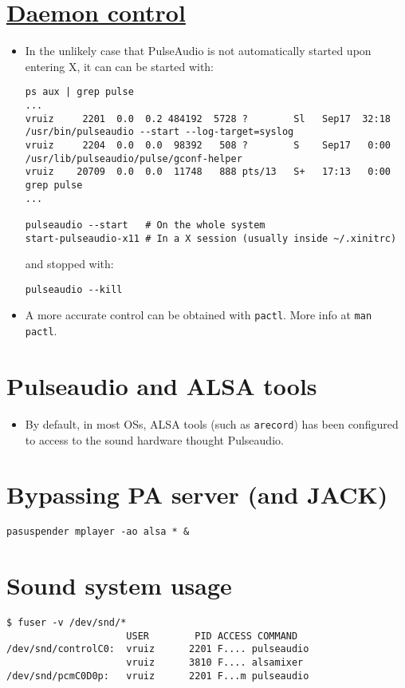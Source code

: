 \section{\href{https://wiki.archlinux.org/index.php/PulseAudio}{Daemon control}}
\begin{itemize}

\item In the unlikely case that PulseAudio is not automatically
  started upon entering X, it can can be started with:
\begin{verbatim}
ps aux | grep pulse
...
vruiz     2201  0.0  0.2 484192  5728 ?        Sl   Sep17  32:18 /usr/bin/pulseaudio --start --log-target=syslog
vruiz     2204  0.0  0.0  98392   508 ?        S    Sep17   0:00 /usr/lib/pulseaudio/pulse/gconf-helper
vruiz    20709  0.0  0.0  11748   888 pts/13   S+   17:13   0:00 grep pulse
...

pulseaudio --start   # On the whole system
start-pulseaudio-x11 # In a X session (usually inside ~/.xinitrc)
\end{verbatim}
and stopped with:
\begin{verbatim}
pulseaudio --kill
\end{verbatim}

\item A more accurate control can be obtained with
  \texttt{pactl}. More info at \texttt{man pactl}.

\end{itemize}

\section{Pulseaudio and ALSA tools}
\begin{itemize}
\item By default, in most OSs, ALSA tools (such as \texttt{arecord})
  has been configured to access to the sound hardware thought
  Pulseaudio.
\end{itemize}

\section{Bypassing PA server (and JACK)}
\begin{verbatim}
pasuspender mplayer -ao alsa * &
\end{verbatim}

\section{Sound system usage}
\begin{verbatim}
$ fuser -v /dev/snd/*
                     USER        PID ACCESS COMMAND
/dev/snd/controlC0:  vruiz      2201 F.... pulseaudio
                     vruiz      3810 F.... alsamixer
/dev/snd/pcmC0D0p:   vruiz      2201 F...m pulseaudio
\end{verbatim}

